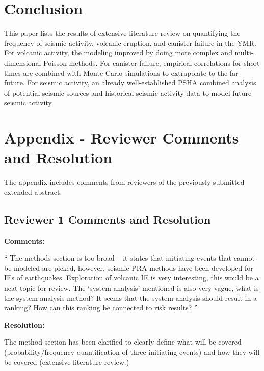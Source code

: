 \documentclass[12pt]{article}
\begin{document}
\section{Conclusion}

This paper lists the results of extensive literature
review on quantifying the frequency of seismic activity,
volcanic eruption, and canister failure in the \gls{YMR}.
For volcanic activity, the modeling improved by doing more
complex and multi-dimensional Poisson methods. For canister
failure, empirical correlations for short times are combined
with Monte-Carlo simulations to extrapolate to the far future.
For seismic activity, an already well-established \gls{PSHA}
combined analysis of potential seismic sources and historical
seismic activity data to model future seismic activity.


\section{Appendix - Reviewer Comments and Resolution}
The appendix includes comments from reviewers of the previously
submitted extended abstract.

\subsection{Reviewer 1 Comments and Resolution}

\textbf{Comments:}

\begin{center}
    \begin{varwidth}{0.8\textwidth}

`` The methods section is too broad – it states that initiating events that cannot be modeled are picked, however, seismic PRA methods have been developed for IEs of earthquakes. Exploration of volcanic IE is very interesting, this would be a neat topic for review. The ‘system analysis’ mentioned is also very vague, what is the system analysis method? It seems that the system analysis should result in a ranking? How can this ranking be connected to risk results? ''
    \end{varwidth}
\end{center}


\noindent \textbf{Resolution:}

The method section has been clarified to clearly define what will be
covered (probability/frequency quantification of three initiating events)
and how they will be covered (extensive literature review.)
\end{document}
